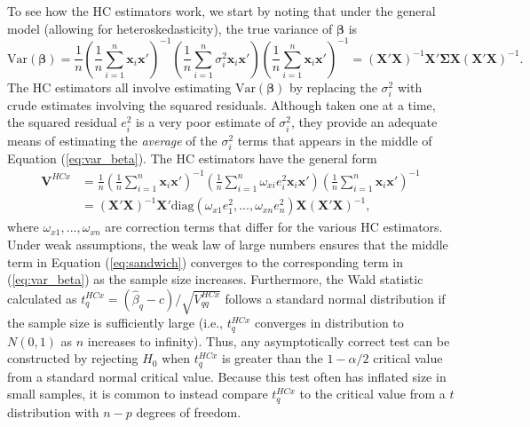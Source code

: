 \documentclass{article}\usepackage[]{graphicx}\usepackage[]{color}
\newcommand{\Var}{\text{Var}}
\newcommand{\diag}{\text{diag}}
\newcommand{\bm}{\mathbf}
\newcommand{\bs}{\boldsymbol}
\begin{document}
To see how the HC estimators work, we start by noting that under the general model (allowing for heteroskedasticity), the true variance of $\bs\beta$ is
\begin{equation}
\label{eq:var_beta}
\Var\left(\bs\beta\right) = \frac{1}{n}\left(\frac{1}{n}\sum_{i=1}^n \bm{x}_i\bm{x}'\right)^{-1}\left(\frac{1}{n}\sum_{i=1}^n \sigma_i^2 \bm{x}_i\bm{x}'\right)\left(\frac{1}{n}\sum_{i=1}^n \bm{x}_i\bm{x}'\right)^{-1} = \left(\bm{X}'\bm{X}\right)^{-1} \bm{X}'\bs\Sigma \bm{X}\left(\bm{X}'\bm{X}\right)^{-1}.
\end{equation}
The HC estimators all involve estimating $\Var\left(\bs\beta\right)$ by replacing the $\sigma_i^2$ with crude estimates involving the squared residuals. Although taken one at a time, the squared residual $e_i^2$ is a very poor estimate of $\sigma_i^2$, they provide an adequate means of estimating the \textit{average} of the $\sigma_i^2$ terms that appears in the middle of Equation (\ref{eq:var_beta}). The HC estimators have the general form 
\begin{equation}
\label{eq:sandwich}
\begin{aligned}
\bm{V}^{HCx} &= \frac{1}{n}\left(\frac{1}{n}\sum_{i=1}^n \bm{x}_i\bm{x}'\right)^{-1}\left(\frac{1}{n}\sum_{i=1}^n \omega_{xi} e_i^2 \bm{x}_i\bm{x}'\right)\left(\frac{1}{n}\sum_{i=1}^n \bm{x}_i\bm{x}'\right)^{-1} \\
&= \left(\bm{X}'\bm{X}\right)^{-1} \bm{X}'\diag\left(\omega_{x1} e_1^2,...,\omega_{xn} e_n^2\right) \bm{X}\left(\bm{X}'\bm{X}\right)^{-1},
\end{aligned}
\end{equation}
where $\omega_{x1},...,\omega_{xn}$ are correction terms that differ for the various HC estimators. Under weak assumptions, the weak law of large numbers ensures that the middle term in Equation (\ref{eq:sandwich}) converges to the corresponding term in (\ref{eq:var_beta}) as the sample size increases. Furthermore, the Wald statistic calculated as $t^{HCx}_q = \left(\hat\beta_q - c\right) / \sqrt{V^{HCx}_{qq}}$ follows a standard normal distribution if the sample size is sufficiently large (i.e., $t^{HCx}_q$ converges in distribution to $N(0,1)$ as $n$ increases to infinity). Thus, any asymptotically correct test can be constructed by rejecting $H_0$ when $t^{HCx}_q$ is greater than the $1 - \alpha / 2$ critical value from a standard normal critical value. Because this test often has inflated size in small samples, it is common to instead compare $t^{HCx}_q$ to the critical value from a $t$ distribution with $n - p$ degrees of freedom.
\end{document}
